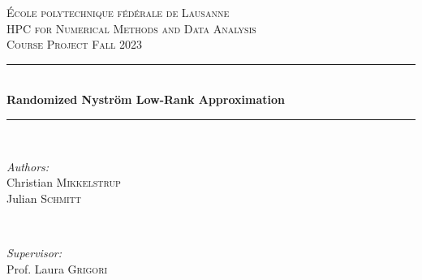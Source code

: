 \begin{titlepage}
\newcommand{\HRule}{\rule{\linewidth}{0.5mm}} %

\center %


\vspace{3cm}
\textsc{\LARGE École polytechnique fédérale de Lausanne}\\[1.5cm] %
\textsc{\Large HPC for Numerical Methods and Data Analysis}\\[0.5cm] %
\textsc{\large Course Project Fall 2023}\\[0.5cm] %


\HRule \\[0.4cm] %
{ \huge \bfseries Randomized Nyström Low-Rank Approximation}\\[0.4cm] %
\HRule \\[1.5cm]


\begin{minipage}{0.4\textwidth}
\begin{flushleft} \large
\emph{Authors:}\\
Christian \textsc{Mikkelstrup}\\
Julian \textsc{Schmitt} %
\end{flushleft}
\end{minipage}
~
\begin{minipage}{0.4\textwidth}
\begin{flushright} \large
\emph{Supervisor:} \\
Prof. Laura \textsc{Grigori} %
\end{flushright}
\end{minipage}\\[10cm]


\end{titlepage}
